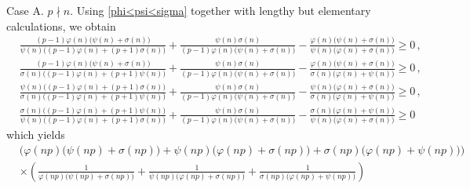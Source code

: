 \documentclass[12pt]{article}
\begin{document}
Case A.  \;  $p\nmid n$. Using \eqref{phi<psi<sigma} together with lengthy but elementary calculations, we obtain
\begin{align*}
&\frac{(p-1)\varphi(n)\big(\psi(n)+\sigma(n)\big)}{\psi(n)\big((p-1)\varphi(n)+(p+1)\sigma(n)\big)}+\frac{\psi(n)\sigma(n)}{(p-1)\varphi(n)\big(\psi(n)+\sigma(n)\big)}
-\frac{\varphi(n)\big(\psi(n)+\sigma(n)\big)}{\psi(n)\big(\varphi(n)+\sigma(n)\big)}\geq0\,,\\
&\frac{(p-1)\varphi(n)\big(\psi(n)+\sigma(n)\big)}{\sigma(n)\big((p-1)\varphi(n)+(p+1)\psi(n)\big)}+\frac{\psi(n)\sigma(n)}{(p-1)\varphi(n)\big(\psi(n)+\sigma(n)\big)}
-\frac{\varphi(n)\big(\psi(n)+\sigma(n)\big)}{\sigma(n)\big(\varphi(n)+\psi(n)\big)}\geq0\,,\\
&\frac{\psi(n)\big((p-1)\varphi(n)+(p+1)\sigma(n)\big)}{\sigma(n)\big((p-1)\varphi(n)+(p+1)\psi(n)\big)}+\frac{\psi(n)\sigma(n)}{(p-1)\varphi(n)\big(\psi(n)+\sigma(n)\big)}
-\frac{\psi(n)\big(\varphi(n)+\sigma(n)\big)}{\sigma(n)\big(\varphi(n)+\psi(n)\big)}\geq0\,,\\
&\frac{\sigma(n)\big((p-1)\varphi(n)+(p+1)\psi(n)\big)}{\psi(n)\big((p-1)\varphi(n)+(p+1)\sigma(n)\big)}+\frac{\psi(n)\sigma(n)}{(p-1)\varphi(n)\big(\psi(n)+\sigma(n)\big)}
-\frac{\sigma(n)\big(\varphi(n)+\psi(n)\big)}{\psi(n)\big(\varphi(n)+\sigma(n)\big)}\geq0
\end{align*}
which yields
\begin{align*}
&\Big(\varphi(np)\big(\psi(np)+\sigma(np)\big)+\psi(np)\big(\varphi(np)+\sigma(np)\big)+\sigma(np)\big(\varphi(np)+\psi(np)\big)\Big)\\
&\times\left(\frac{1}{\varphi(np)\big(\psi(np)+\sigma(np)\big)}+\frac{1}{\psi(np)\big(\varphi(np)+\sigma(np)\big)}+\frac{1}{\sigma(np)\big(\varphi(np)+\psi(np)\big)}\right)\\
\end{align*}
\end{document}
